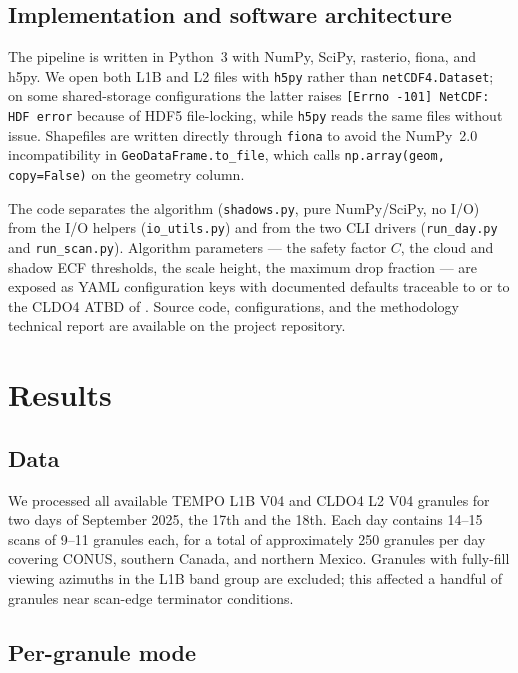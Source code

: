 \documentclass[11pt,a4paper]{article}
\newcommand{\code}[1]{\texttt{#1}}
\begin{document}
\subsection{Implementation and software architecture}\label{sec:software}

The pipeline is written in Python~3 with NumPy, SciPy, rasterio, fiona,
and h5py. We open both L1B and L2 files with \code{h5py} rather than
\code{netCDF4.Dataset}; on some shared-storage configurations the
latter raises \verb|[Errno -101] NetCDF: HDF error| because of HDF5
file-locking, while \code{h5py} reads the same files without issue.
Shapefiles are written directly through \code{fiona} to avoid the
NumPy~2.0 incompatibility in \code{GeoDataFrame.to\_file}, which calls
\code{np.array(geom, copy=False)} on the geometry column.

The code separates the algorithm (\code{shadows.py}, pure NumPy/SciPy,
no I/O) from the I/O helpers (\code{io\_utils.py}) and from the two CLI
drivers (\code{run\_day.py} and \code{run\_scan.py}). Algorithm
parameters --- the safety factor $C$, the cloud and shadow ECF
thresholds, the scale height, the maximum drop fraction --- are exposed
as YAML configuration keys with documented defaults traceable to
\citet{trees2022darclos} or to the CLDO4 ATBD of
\citet{wang2025cldo4}. Source code, configurations, and the methodology
technical report are available on the project repository.

\section{Results}\label{sec:results}

\subsection{Data}\label{sec:data}

We processed all available TEMPO L1B V04 and CLDO4 L2 V04 granules for
two days of September 2025, the 17th and the 18th. Each day contains
14--15 scans of 9--11 granules each, for a total of approximately 250
granules per day covering CONUS, southern Canada, and northern Mexico.
Granules with fully-fill viewing azimuths in the L1B band group are
excluded; this affected a handful of granules near scan-edge terminator
conditions.

\subsection{Per-granule mode}\label{sec:res-granule}
\end{document}
